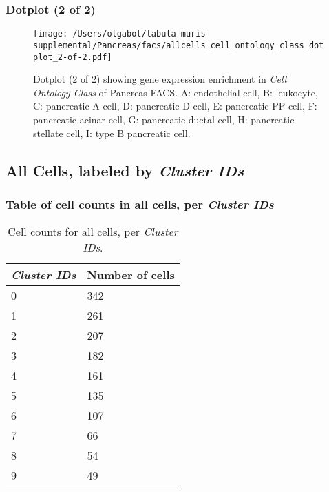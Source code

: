 \clearpage

\subsubsection{Dotplot (2 of 2)}
\begin{figure}[h]
\centering
\texttt{[image: /Users/olgabot/tabula-muris-supplemental/Pancreas/facs/allcells\_cell\_ontology\_class\_dotplot\_2-of-2.pdf]}

\caption{ Dotplot (2 of 2)  showing gene expression enrichment in \emph{Cell Ontology Class} of Pancreas FACS. A: endothelial cell, B: leukocyte, C: pancreatic A cell, D: pancreatic D cell, E: pancreatic PP cell, F: pancreatic acinar cell, G: pancreatic ductal cell, H: pancreatic stellate cell, I: type B pancreatic cell.}
\end{figure}


\clearpage

\subsection{All Cells, labeled by \emph{Cluster IDs}}
\subsubsection{Table of cell counts in all cells, per \emph{Cluster IDs}}\begin{table}[h]
\centering
\label{my-label}
\begin{tabular}{@{}ll@{}}
\toprule

\emph{Cluster IDs}& Number of cells \\ \midrule
0 & 342 \\

1 & 261 \\

2 & 207 \\

3 & 182 \\

4 & 161 \\

5 & 135 \\

6 & 107 \\

7 & 66 \\

8 & 54 \\

9 & 49 \\
\bottomrule
\end{tabular}
\caption{Cell counts for all cells, per \emph{Cluster IDs}.}
\end{table}

